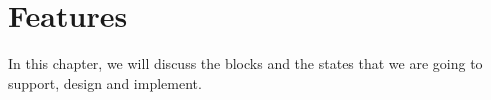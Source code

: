 \chapter{Features}
In this chapter, we will discuss the blocks and the states that we are going to support, design and implement.






